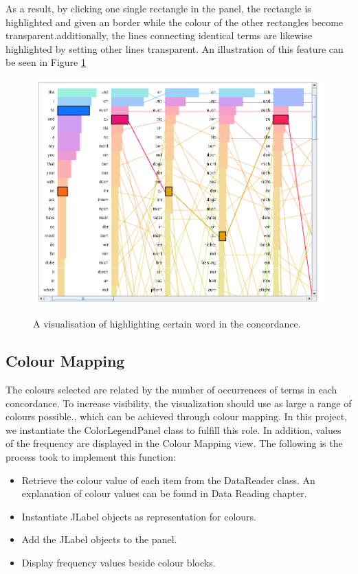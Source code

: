 As a result, by clicking one single rectangle in the panel, the rectangle is highlighted and given an border while the colour of the other rectangles become transparent.additionally, the lines connecting identical terms are likewise highlighted by setting other lines transparent. An illustration of this feature can be seen in Figure \ref{fig:highlightView}

\begin{figure}[H]
	\centering	
	\includegraphics[scale=0.6]{Figs/Highlight-Terms}\\[1ex]
	\caption{A visualisation of highlighting certain word in the concordance.}
	\label{fig:highlightView}
\end{figure} 

\subsection{Colour Mapping}

The colours selected are related by the number of occurrences of terms in each concordance. To increase visibility, the visualization should use as large a range of colours possible., which can be achieved through colour mapping. In this project, we instantiate the ColorLegendPanel class to fulfill this role. In addition, values of the frequency are displayed in the Colour Mapping view. The following is the process took to implement this function: 
\begin{itemize}
	\item \textbf{} Retrieve the colour value of each item from the DataReader class. An explanation of colour values can be found in Data Reading chapter.
	\item \textbf{} Instantiate JLabel objects as representation for colours.
	\item \textbf{} Add the JLabel objects to the panel.
	\item \textbf{} Display frequency values beside colour blocks.
\end{itemize}

